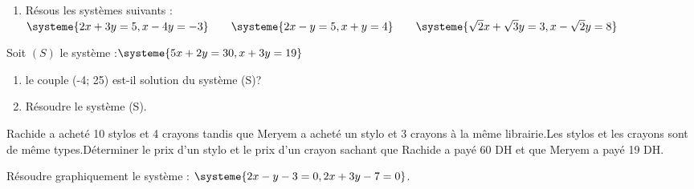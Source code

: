 \documentclass[a4paper,12pt]{article}
\begin{document}
\begin{exo}
\begin{enumerate}
\item Résous les systèmes suivants :
\(
\systeme{2x+3y=5,x-4y=-3}      
\qquad
\systeme{2x-y=5,x+y=4}
\qquad
\systeme{\sqrt{2}x+\sqrt{3}y=3,x-\sqrt{2}y=8}
\)
\end{enumerate}
\end{exo}

\begin{exo}
Soit $(S)$ le système :$\systeme{5x+2y=30, x+3y=19}$
\begin{enumerate}
\item le couple (-4; 25) est-il solution du système (S)?
\item Résoudre le système (S).
\end{enumerate}
Rachide a acheté 10 stylos et 4 crayons tandis que Meryem a acheté un stylo et 3 crayons à la même librairie.Les stylos et les crayons sont de même types.Déterminer le prix d'un stylo et le prix d'un crayon sachant que Rachide a payé 60 DH et que  Meryem a payé 19 DH.

Résoudre graphiquement le système : $\systeme{2x-y-3=0,2x+3y-7=0}$.
\end{exo}
\end{document}
